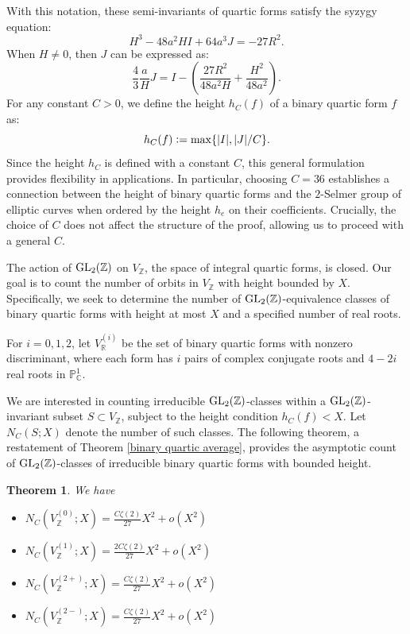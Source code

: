 \documentclass{article}
\def\Z{{\mathbb Z}}
\def\GL{{\rm GL}}
\def\Z{{\mathbb Z}}
\newtheorem{theorem}{Theorem}[section]
\begin{document}
With this notation, these semi-invariants of quartic forms satisfy the syzygy equation:
\begin{equation}\label{syzygy}
    H^3 - 48 a^2 H I + 64 a^3 J = -27 R^2.
\end{equation}
When $H \neq 0$, then $J$ can be expressed as:
\begin{equation}\label{JR}
    \frac{4}{3} \frac{a}{H} J = I - \left( \frac{27 R^2}{48 a^2 H} + \frac{H^2}{48 a^2} \right).
\end{equation}
For any constant $C > 0$, we define the height $h_C(f)$ of a binary quartic form $f$ as:
\begin{equation*}
    h_C(f) \vcentcolon= \max \{ |I|, |J| / C \}.
\end{equation*}
Since the height $h_C$ is defined with a constant $C$, this general formulation provides flexibility in applications. In particular, choosing $C = 36$ establishes a connection between the height of binary quartic forms and the $2$-Selmer group of elliptic curves when ordered by the height $h_e$ on their coefficients. Crucially, the choice of $C$ does not affect the structure of the proof, allowing us to proceed with a general $C$.


The action of $\GL_2(\mathbb{Z})$ on $V_{\mathbb{Z}}$, the space of integral quartic forms, is closed. Our goal is to count the number of orbits in $V_{\mathbb{Z}}$ with height bounded by $X$. Specifically, we seek to determine the number of $\GL_2(\mathbb{Z})$-equivalence classes of binary quartic forms with height at most $X$ and a specified number of real roots.

For $i = 0, 1, 2$, let $V_\mathbb{R}^{(i)}$ be the set of binary quartic forms with nonzero discriminant, where each form has $i$ pairs of complex conjugate roots and $4 - 2i$ real roots in $\mathbb{P}^1_\mathbb{C}$.

We are interested in counting irreducible $\GL_2(\mathbb{Z})$-classes within a $\GL_2(\mathbb{Z})$-invariant subset $S \subset V_{\mathbb{Z}}$, subject to the height condition $h_C(f) < X$. Let $N_C(S; X)$ denote the number of such classes. The following theorem, a restatement of Theorem \ref{binary quartic average}, provides the asymptotic count of $\GL_2(\mathbb{Z})$-classes of irreducible binary quartic forms with bounded height.

\begin{theorem}\label{The-Main-counting-Theo} We have
\begin{itemize}
\item[\textnormal{(a)}] 
$N_{C}(V_{\Z}^{(0)};X)=\frac{
C\zeta(2)}{27}X^2+o(X^2)$
\item[\textnormal{(b)}] $N_{C}(V_{\Z}^{(1)};X)=\frac{2C\zeta(2)}{27}X^2+o(X^2)$
\item[\textnormal{(c)}] $N_{C}(V_{\Z}^{(2+)};X)=\frac{C\zeta(2)}{27}X^2+o(X^2)$
\item[\textnormal{(d)}] $N_{C}(V_{\Z}^{(2-)};X)=\frac{C\zeta(2)}{27}X^2+o(X^2)$
\end{itemize}
\end{theorem}
\end{document}
